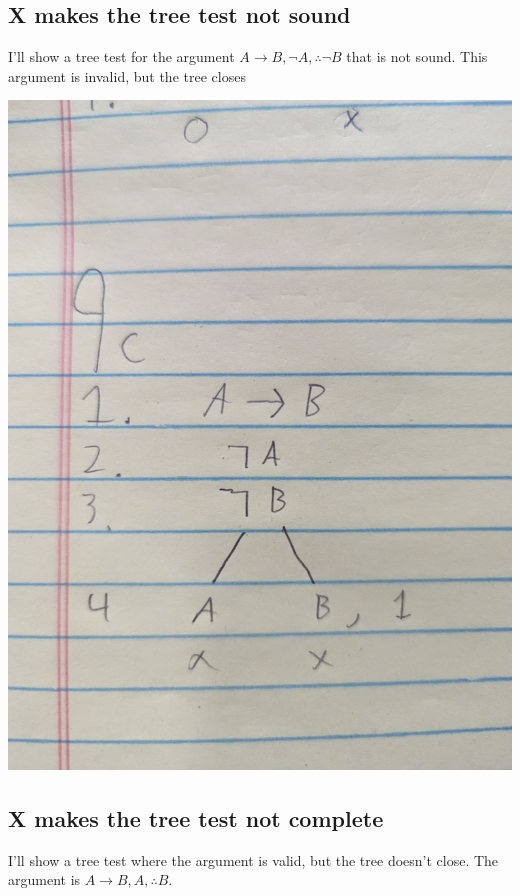 \documentclass[12pt]{article}
\begin{document}
\subsection*{X makes the tree test not sound}

I'll show a tree test for the argument $A \rightarrow B, \neg A, \therefore \neg B$ that is not sound. This argument is invalid, but the tree closes

\includegraphics[width=\textwidth]{9c}


\subsection*{X makes the tree test not complete}

I'll show a tree test where the argument is valid, but the tree doesn't close. The argument is $A \rightarrow B, A, \therefore B$. 
\end{document}
